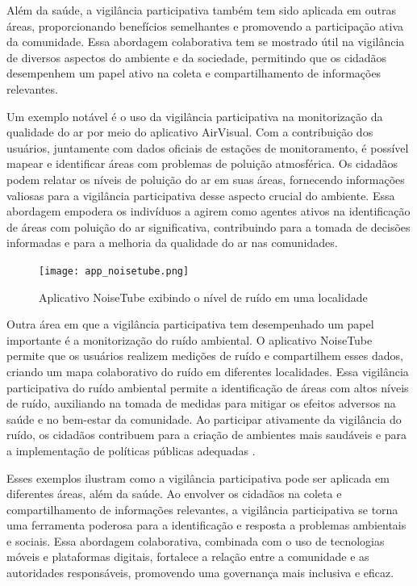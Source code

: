 Além da saúde, a vigilância participativa também tem sido aplicada em outras áreas, proporcionando benefícios semelhantes e promovendo a participação ativa da comunidade. Essa abordagem colaborativa tem se mostrado útil na vigilância de diversos aspectos do ambiente e da sociedade, permitindo que os cidadãos desempenhem um papel ativo na coleta e compartilhamento de informações relevantes.

Um exemplo notável é o uso da vigilância participativa na monitorização da qualidade do ar por meio do aplicativo AirVisual. Com a contribuição dos usuários, juntamente com dados oficiais de estações de monitoramento, é possível mapear e identificar áreas com problemas de poluição atmosférica. Os cidadãos podem relatar os níveis de poluição do ar em suas áreas, fornecendo informações valiosas para a vigilância participativa desse aspecto crucial do ambiente. Essa abordagem empodera os indivíduos a agirem como agentes ativos na identificação de áreas com poluição do ar significativa, contribuindo para a tomada de decisões informadas e para a melhoria da qualidade do ar nas comunidades.

\begin{figure}[!htb]
    \caption{Aplicativo NoiseTube exibindo o nível de ruído em uma localidade}
    \label{fig:app_noisetube}
    \centering
    \texttt{[image: app\_noisetube.png]}
\end{figure}

Outra área em que a vigilância participativa tem desempenhado um papel importante é a monitorização do ruído ambiental. O aplicativo NoiseTube permite que os usuários realizem medições de ruído e compartilhem esses dados, criando um mapa colaborativo do ruído em diferentes localidades. Essa vigilância participativa do ruído ambiental permite a identificação de áreas com altos níveis de ruído, auxiliando na tomada de medidas para mitigar os efeitos adversos na saúde e no bem-estar da comunidade. Ao participar ativamente da vigilância do ruído, os cidadãos contribuem para a criação de ambientes mais saudáveis e para a implementação de políticas públicas adequadas \cite{2010_Arnand}.

Esses exemplos ilustram como a vigilância participativa pode ser aplicada em diferentes áreas, além da saúde. Ao envolver os cidadãos na coleta e compartilhamento de informações relevantes, a vigilância participativa se torna uma ferramenta poderosa para a identificação e resposta a problemas ambientais e sociais. Essa abordagem colaborativa, combinada com o uso de tecnologias móveis e plataformas digitais, fortalece a relação entre a comunidade e as autoridades responsáveis, promovendo uma governança mais inclusiva e eficaz.

